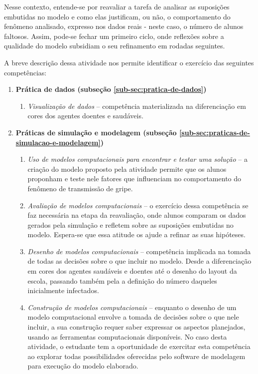 Nesse contexto, entende-se por reavaliar a tarefa de analisar as suposições embutidas no modelo e como elas justificam, ou não, o comportamento do fenômeno analisado, expresso nos dados reais - neste caso, o número de alunos faltosos. Assim, pode-se fechar um primeiro ciclo, onde reflexões sobre a qualidade do modelo subsidiam o seu refinamento em rodadas seguintes.

A breve descrição dessa atividade nos permite identificar o exercício das seguintes competências:

\begin{enumerate}
  \item \textbf{Prática de dados (subseção \ref{sub-sec:pratica-de-dados})}
    \begin{enumerate}
      \item \textit{Visualização de dados} -- competência materializada na diferenciação em cores dos agentes doentes e saudáveis.
    \end{enumerate}

  \item \textbf{Práticas de simulação e modelagem (subseção \ref{sub-sec:praticas-de-simulacao-e-modelagem})}
    \begin{enumerate}
      \item \textit{Uso de modelos computacionais para encontrar e testar uma solução} -- a criação do modelo proposto pela atividade permite que os alunos proponham e teste nele fatores que influenciam no comportamento do fenômeno de transmissão de gripe.

      \item \textit{Avaliação de modelos computacionais} -- o exercício dessa competência se faz necessária na etapa da reavaliação, onde alunos comparam os dados gerados pela simulação e refletem sobre as suposições embutidas no modelo. Espera-se que essa atitude os ajude a refinar as suas hipóteses. 
     
      \item \textit{Desenho de modelos computacionais} -- competência implicada na tomada de todas as decisões sobre o que incluir no modelo. Desde a diferenciação em cores dos agentes saudáveis e doentes até o desenho do layout da escola, passando também pela a definição do número daqueles inicialmente infectados.

      \item \textit{Construção de modelos computacionais} -- enquanto o desenho de um modelo computacional envolve a tomada de decisões sobre o que nele incluir, a sua construção requer saber expressar os aspectos planejados, usando as ferramentas computacionais disponíveis. No caso desta atividade, o estudante tem a oportunidade de exercitar esta competência ao explorar todas possibilidades oferecidas pelo software de modelagem para execução do modelo elaborado. 
    \end{enumerate}


\end{enumerate}
